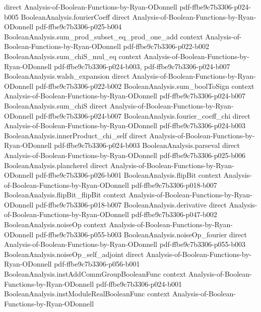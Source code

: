 \begin{theorem}
  {direct}
  {Analysis-of-Boolean-Functions-by-Ryan-ODonnell}
  {pdf-ffbe9c7b3306-p024-b005}
\proofstep
  {BooleanAnalysis.fourierCoeff}
  {direct}
  {Analysis-of-Boolean-Functions-by-Ryan-ODonnell}
  {pdf-ffbe9c7b3306-p025-b004}
\proofstep
  {BooleanAnalysis.sum_prod_subset_eq_prod_one_add}
  {context}
  {Analysis-of-Boolean-Functions-by-Ryan-ODonnell}
  {pdf-ffbe9c7b3306-p022-b002}
\proofstep
  {BooleanAnalysis.sum_chiS_mul_eq}
  {context}
  {Analysis-of-Boolean-Functions-by-Ryan-ODonnell}
  {pdf-ffbe9c7b3306-p024-b003,
    pdf-ffbe9c7b3306-p024-b007}
\proofstep
  {BooleanAnalysis.walsh_expansion}
  {direct}
  {Analysis-of-Boolean-Functions-by-Ryan-ODonnell}
  {pdf-ffbe9c7b3306-p022-b002}
\proofstep
  {BooleanAnalysis.sum_boolToSign}
  {context}
  {Analysis-of-Boolean-Functions-by-Ryan-ODonnell}
  {pdf-ffbe9c7b3306-p024-b007}
\proofstep
  {BooleanAnalysis.sum_chiS}
  {direct}
  {Analysis-of-Boolean-Functions-by-Ryan-ODonnell}
  {pdf-ffbe9c7b3306-p024-b007}
\proofstep
  {BooleanAnalysis.fourier_coeff_chi}
  {direct}
  {Analysis-of-Boolean-Functions-by-Ryan-ODonnell}
  {pdf-ffbe9c7b3306-p024-b003}
\proofstep
  {BooleanAnalysis.innerProduct_chi_self}
  {direct}
  {Analysis-of-Boolean-Functions-by-Ryan-ODonnell}
  {pdf-ffbe9c7b3306-p024-b003}
\proofstep
  {BooleanAnalysis.parseval}
  {direct}
  {Analysis-of-Boolean-Functions-by-Ryan-ODonnell}
  {pdf-ffbe9c7b3306-p025-b006}
\proofstep
  {BooleanAnalysis.plancherel}
  {direct}
  {Analysis-of-Boolean-Functions-by-Ryan-ODonnell}
  {pdf-ffbe9c7b3306-p026-b001}
\proofstep
  {BooleanAnalysis.flipBit}
  {context}
  {Analysis-of-Boolean-Functions-by-Ryan-ODonnell}
  {pdf-ffbe9c7b3306-p018-b007}
\proofstep
  {BooleanAnalysis.flipBit_flipBit}
  {context}
  {Analysis-of-Boolean-Functions-by-Ryan-ODonnell}
  {pdf-ffbe9c7b3306-p018-b007}
\proofstep
  {BooleanAnalysis.derivative}
  {direct}
  {Analysis-of-Boolean-Functions-by-Ryan-ODonnell}
  {pdf-ffbe9c7b3306-p047-b002}
\proofstep
  {BooleanAnalysis.noiseOp}
  {context}
  {Analysis-of-Boolean-Functions-by-Ryan-ODonnell}
  {pdf-ffbe9c7b3306-p055-b003}
\proofstep
  {BooleanAnalysis.noiseOp_fourier}
  {direct}
  {Analysis-of-Boolean-Functions-by-Ryan-ODonnell}
  {pdf-ffbe9c7b3306-p055-b003}
\proofstep
  {BooleanAnalysis.noiseOp_self_adjoint}
  {direct}
  {Analysis-of-Boolean-Functions-by-Ryan-ODonnell}
  {pdf-ffbe9c7b3306-p056-b001}
\proofstep
  {BooleanAnalysis.instAddCommGroupBooleanFunc}
  {context}
  {Analysis-of-Boolean-Functions-by-Ryan-ODonnell}
  {pdf-ffbe9c7b3306-p024-b001}
\proofstep
  {BooleanAnalysis.instModuleRealBooleanFunc}
  {context}
  {Analysis-of-Boolean-Functions-by-Ryan-ODonnell}

\end{theorem}
